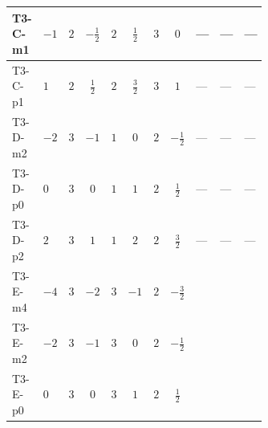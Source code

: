 \documentclass[8pt]{article}
\begin{document}
\begin{landscape}
\begin{longtable}{@{}llcccccc >{\raggedright\arraybackslash}p{0.21\linewidth} >{\raggedright\arraybackslash}p{0.21\linewidth} >{\raggedright\arraybackslash}p{0.21\linewidth}@{}}
\midrule
T3-C-m1 & $-1$ & $2$ & $-\frac{1}{2}$ & $2$ & $\frac{1}{2}$ & $3$ & $0$ & --- & --- & --- \\
\midrule
T3-C-p1 & $1$ & $2$ & $\frac{1}{2}$ & $2$ & $\frac{3}{2}$ & $3$ & $1$ & --- & --- & --- \\
\midrule
T3-D-m2 & $-2$ & $3$ & $-1$ & $1$ & $0$ & $2$ & $-\frac{1}{2}$ & --- & --- & --- \\
\midrule
T3-D-p0 & $0$ & $3$ & $0$ & $1$ & $1$ & $2$ & $\frac{1}{2}$ & --- & --- & --- \\
\midrule
T3-D-p2 & $2$ & $3$ & $1$ & $1$ & $2$ & $2$ & $\frac{3}{2}$ & --- & --- & --- \\
\midrule
T3-E-m4 & $-4$ & $3$ & $-2$ & $3$ & $-1$ & $2$ & $-\frac{3}{2}$ & \scriptsize\adjustbox{max width=\linewidth}{$\begin{gathered} +{\lambda_{S_1}^{(1)}} (2 {\lambda_{12}^{(1)}}+3 {\lambda_{12}^{(\times)}})\end{gathered}$} & \scriptsize\adjustbox{max width=\linewidth}{$\begin{gathered} +{\lambda_{S_2}^{(1)}} (2 {\lambda_{12}^{(1)}}+3 {\lambda_{12}^{(\times)}})\end{gathered}$} & \scriptsize\adjustbox{max width=\linewidth}{$\begin{gathered} +4 {\lambda_{12}^{(A)}}^2\end{gathered}$} \\
\midrule
T3-E-m2 & $-2$ & $3$ & $-1$ & $3$ & $0$ & $2$ & $-\frac{1}{2}$ & \scriptsize\adjustbox{max width=\linewidth}{$\begin{gathered} +{\lambda_{S_1}^{(1)}} (2 {\lambda_{12}^{(1)}}+3 {\lambda_{12}^{(\times)}})\end{gathered}$} & \scriptsize\adjustbox{max width=\linewidth}{$\begin{gathered} +{\lambda_{S_2}^{(1)}} (2 {\lambda_{12}^{(1)}}+3 {\lambda_{12}^{(\times)}})\end{gathered}$} & \scriptsize\adjustbox{max width=\linewidth}{$\begin{gathered} +4 {\lambda_{12}^{(A)}}^2\end{gathered}$} \\
\midrule
T3-E-p0 & $0$ & $3$ & $0$ & $3$ & $1$ & $2$ & $\frac{1}{2}$ & \scriptsize\adjustbox{max width=\linewidth}{$\begin{gathered} +{\lambda_{S_1}^{(1)}} (2 {\lambda_{12}^{(1)}}+3 {\lambda_{12}^{(\times)}})\end{gathered}$} & \scriptsize\adjustbox{max width=\linewidth}{$\begin{gathered} +{\lambda_{S_2}^{(1)}} (2 {\lambda_{12}^{(1)}}+3 {\lambda_{12}^{(\times)}})\end{gathered}$} & \scriptsize\adjustbox{max width=\linewidth}{$\begin{gathered} +4 {\lambda_{12}^{(A)}}^2\end{gathered}$} \\

\end{longtable}
\end{landscape}
\end{document}

